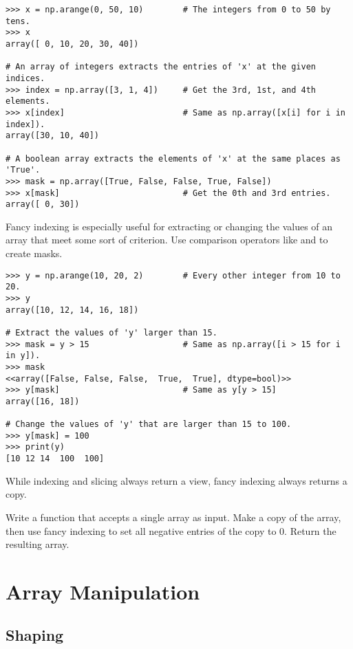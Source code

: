 \begin{lstlisting}
>>> x = np.arange(0, 50, 10)        # The integers from 0 to 50 by tens.
>>> x
array([ 0, 10, 20, 30, 40])

# An array of integers extracts the entries of 'x' at the given indices.
>>> index = np.array([3, 1, 4])     # Get the 3rd, 1st, and 4th elements.
>>> x[index]                        # Same as np.array([x[i] for i in index]).
array([30, 10, 40])

# A boolean array extracts the elements of 'x' at the same places as 'True'.
>>> mask = np.array([True, False, False, True, False])
>>> x[mask]                         # Get the 0th and 3rd entries.
array([ 0, 30])
\end{lstlisting}

Fancy indexing is especially useful for extracting or changing the values of an array that meet some sort of criterion.
Use comparison operators like \li{<} and \li{==} to create masks.

\begin{lstlisting}
>>> y = np.arange(10, 20, 2)        # Every other integer from 10 to 20.
>>> y
array([10, 12, 14, 16, 18])

# Extract the values of 'y' larger than 15.
>>> mask = y > 15                   # Same as np.array([i > 15 for i in y]).
>>> mask
<<array([False, False, False,  True,  True], dtype=bool)>>
>>> y[mask]                         # Same as y[y > 15]
array([16, 18])

# Change the values of 'y' that are larger than 15 to 100.
>>> y[mask] = 100
>>> print(y)
[10 12 14  100  100]
\end{lstlisting}

While indexing and slicing always return a view, fancy indexing always returns a copy.

\begin{problem} %
Write a function that accepts a single array as input.
Make a copy of the array, then use fancy indexing to set all negative entries of the copy to $0$.
Return the resulting array.
\end{problem}

\section*{Array Manipulation} %

\subsection*{Shaping} %

